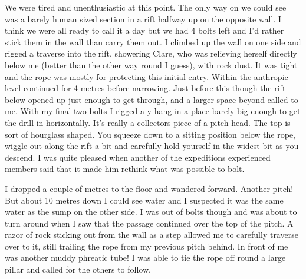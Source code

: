 We were tired and unenthusiastic at this point. The only way on we could see was a barely human sized section in a rift halfway up on the opposite wall. I think we were all ready to call it a day but we had 4 bolts left and I’d rather stick them in the wall than carry them out. I climbed up the wall on one side and rigged a traverse into the rift, showering Clare, who was relieving herself directly below me (better than the other way round I guess), with rock dust. It was tight and the rope was mostly for protecting this initial entry. Within the anthropic level continued for 4 metres before narrowing. Just before this though the rift below opened up just enough to get through, and a larger space beyond called to me. With my final two bolts I rigged a y-hang in a place barely big enough to get the drill in horizontally. It’s really a collectors piece of a pitch head. The top is sort of hourglass shaped. You squeeze down to a sitting position below the rope, wiggle out along the rift a bit and carefully hold yourself in the widest bit as you descend. I was quite pleased when another of the expeditions experienced members said that it made him rethink what was possible to bolt.


 
I dropped a couple of metres to the floor and wandered forward. Another pitch! But about 10 metres down I could see water and I suspected it was the same water as the sump on the other side. I was out of bolts though and was about to turn around when I saw that the passage continued over the top of the pitch. A razor of rock sticking out from the wall as a step allowed me to carefully traverse over to it, still trailing the rope from my previous pitch behind. In front of me was another muddy phreatic tube! I was able to tie the rope off round a large pillar and called for the others to follow.

